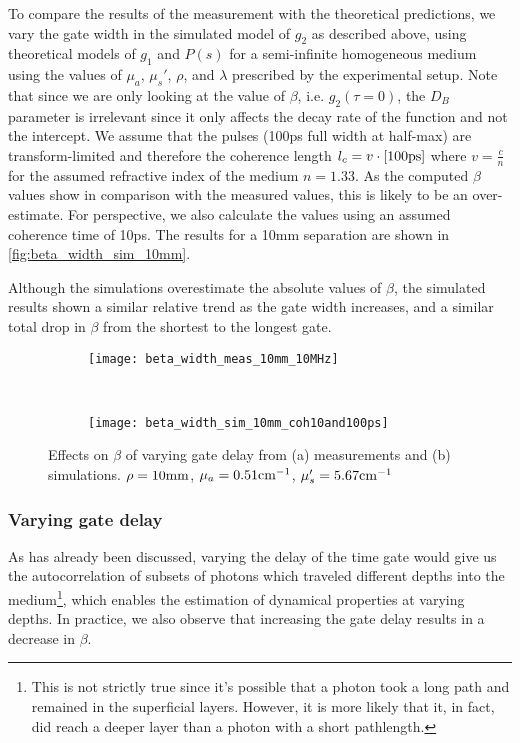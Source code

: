 To compare the results of the measurement with the theoretical predictions, we vary the gate width in the simulated model of $g_2$ as described above, using theoretical models of $g_1$ and $P(s)$ for a semi-infinite homogeneous medium using the values of $\mu_a$, $\mu_s'$, $\rho$, and $\lambda$ prescribed by the experimental setup. Note that since we are only looking at the value of $\beta$, i.e. $g_2(\tau=0)$, the $D_B$ parameter is irrelevant since it only affects the decay rate of the function and not the intercept. We assume that the pulses (100ps full width at half-max) are transform-limited and therefore the coherence length $l_c = v \cdot [100\textnormal{ps}]$ where $v = \frac{c}{n}$ for the assumed refractive index of the medium $n=1.33$. As the computed $\beta$ values show in comparison with the measured values, this is likely to be an over-estimate. For perspective, we also calculate the values using an assumed coherence time of 10ps. The results for a 10mm separation are shown in \autoref{fig:beta_width_sim_10mm}. 

Although the simulations overestimate the absolute values of $\beta$, the simulated results shown a similar relative trend as the gate width increases, and a similar total drop in $\beta$ from the shortest to the longest gate.


\begin{sidewaysfigure}
    \begin{subfigure}{0.5\textwidth}
        \centering
        \texttt{[image: beta\_width\_meas\_10mm\_10MHz]}
        \caption{}
    \label{fig:beta_width_meas_10mm}
    \end{subfigure}~%
    \begin{subfigure}{0.5\textwidth}
        \centering
        \texttt{[image: beta\_width\_sim\_10mm\_coh10and100ps]}
        \caption{}
        \label{fig:beta_width_sim_10mm}
    \end{subfigure}
    \caption{Effects on $\beta$ of varying gate delay from (a) measurements and (b) simulations. $\rho=10\textnormal{mm}$, $\mu_a=0.51\textnormal{cm}^{-1}$, $\mu_s'=5.67\textnormal{cm}^{-1}$ }
    \label{fig:beta_width_10mm}
\end{sidewaysfigure}


\subsubsection{Varying gate delay}
As has already been discussed, varying the delay of the time gate would give us the autocorrelation of subsets of photons which traveled different depths into the medium\footnote{This is not strictly true since it's possible that a photon took a long path and remained in the superficial layers. However, it is more likely that it, in fact, did reach a deeper layer than a photon with a short pathlength.}, which enables the estimation of dynamical properties at varying depths. In practice, we also observe that increasing the gate delay results in a decrease in $\beta$. 

